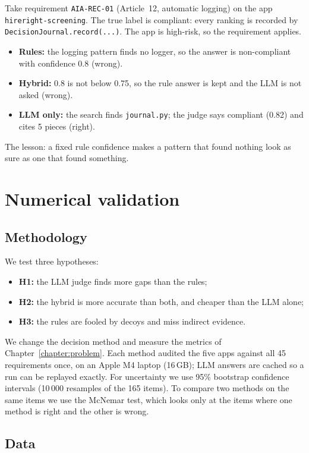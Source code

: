 Take requirement \texttt{AIA-REC-01} (Article~12, automatic logging) on the app \texttt{hireright-screening}. The
true label is compliant: every ranking is recorded by \texttt{DecisionJournal.record(...)}. The app is high-risk, so
the requirement applies.
\begin{itemize}[leftmargin=*]
  \item \textbf{Rules:} the logging pattern finds no logger, so the answer is non-compliant with confidence 0.8 (wrong).
  \item \textbf{Hybrid:} 0.8 is not below 0.75, so the rule answer is kept and the LLM is not asked (wrong).
  \item \textbf{LLM only:} the search finds \texttt{journal.py}; the judge says compliant (0.82) and cites 5 pieces
        (right).
\end{itemize}
The lesson: a fixed rule confidence makes a pattern that found nothing look as sure as one that found something.

\section{Numerical validation}
\label{section:numericalValidation}

\subsection{Methodology}
\label{section:methodology}

We test three hypotheses:
\begin{itemize}[leftmargin=*]
  \item \textbf{H1:} the LLM judge finds more gaps than the rules;
  \item \textbf{H2:} the hybrid is more accurate than both, and cheaper than the LLM alone;
  \item \textbf{H3:} the rules are fooled by decoys and miss indirect evidence.
\end{itemize}
We change the decision method and measure the metrics of Chapter~\ref{chapter:problem}. Each method audited the five
apps against all 45 requirements once, on an Apple M4 laptop (16\,GB); LLM answers are cached so a run can be replayed
exactly. For uncertainty we use 95\% bootstrap confidence intervals (10\,000 resamples of the 165 items). To compare two
methods on the same items we use the McNemar test, which looks only at the items where one method is right and the
other is wrong.

\subsection{Data}
\label{section:data}

